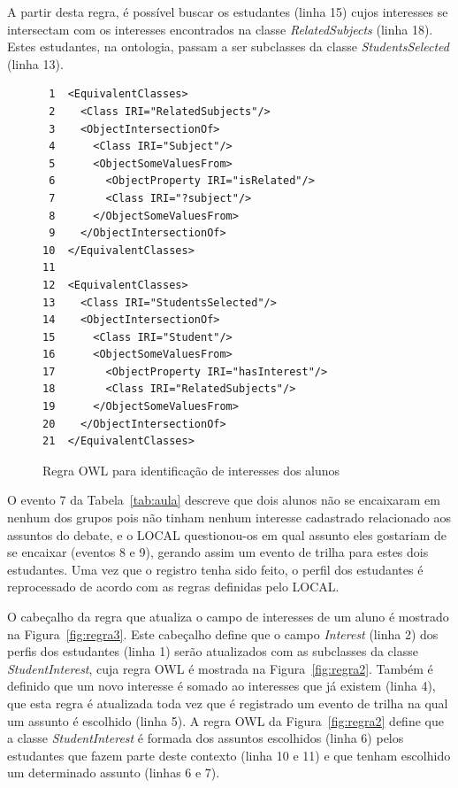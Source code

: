 A partir desta regra, é possível buscar os estudantes (linha 15) cujos interesses se intersectam com os interesses encontrados na classe {\em RelatedSubjects} (linha 18). Estes estudantes, na ontologia, passam a ser subclasses da classe {\em StudentsSelected} (linha 13).

\begin{figure}[!t]
\begin{verbatim}
 1  <EquivalentClasses>
 2    <Class IRI="RelatedSubjects"/>
 3    <ObjectIntersectionOf>
 4      <Class IRI="Subject"/>
 5      <ObjectSomeValuesFrom>
 6        <ObjectProperty IRI="isRelated"/>
 7        <Class IRI="?subject"/>
 8      </ObjectSomeValuesFrom>
 9    </ObjectIntersectionOf>
10  </EquivalentClasses>
11
12  <EquivalentClasses>
13    <Class IRI="StudentsSelected"/>
14    <ObjectIntersectionOf>
15      <Class IRI="Student"/>
16      <ObjectSomeValuesFrom>
17        <ObjectProperty IRI="hasInterest"/>
18        <Class IRI="RelatedSubjects"/>
19      </ObjectSomeValuesFrom>
20    </ObjectIntersectionOf>
21  </EquivalentClasses>
\end{verbatim}
  \caption{Regra OWL para identificação de interesses dos alunos}
  \label{fig:regra1}
\end{figure}

O evento 7 da Tabela~\ref{tab:aula} descreve que dois alunos não se encaixaram em nenhum dos grupos pois não tinham nenhum interesse cadastrado relacionado aos assuntos do debate, e o LOCAL questionou-os em qual assunto eles gostariam de se encaixar (eventos 8 e 9), gerando assim um evento de trilha para estes dois estudantes. Uma vez que o registro tenha sido feito, o perfil dos estudantes é reprocessado de acordo com as regras definidas pelo LOCAL. 

O cabeçalho da regra que atualiza o campo de interesses de um aluno é mostrado na Figura~\ref{fig:regra3}. Este cabeçalho define que o campo {\em Interest} (linha 2) dos perfis dos estudantes (linha 1) serão atualizados com as subclasses da classe {\em StudentInterest}, cuja regra OWL é mostrada na Figura~\ref{fig:regra2}. Também é definido que um novo interesse é somado ao interesses que já existem (linha 4), que esta regra é atualizada toda vez que é registrado um evento de trilha na qual um assunto é escolhido (linha 5). A regra OWL da Figura~\ref{fig:regra2} define que a classe {\em StudentInterest} é formada dos assuntos escolhidos (linha 6) pelos estudantes que fazem parte deste contexto (linha 10 e 11) e que tenham escolhido um determinado assunto (linhas 6 e 7).

